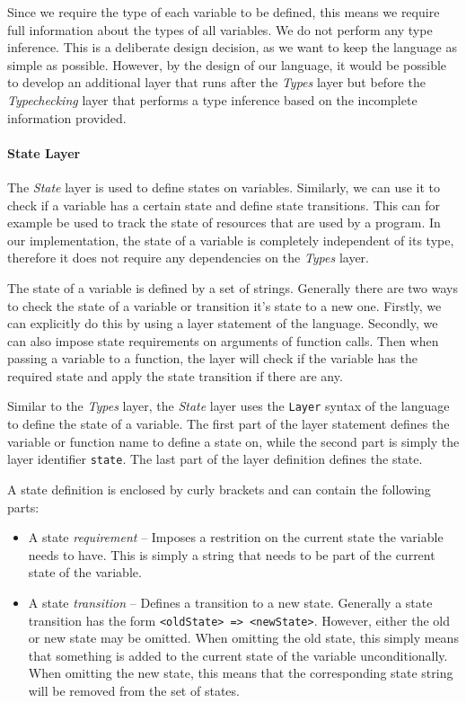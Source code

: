 \documentclass[acmsmall, review, screen]{acmart}
\begin{document}
Since we require the type of each variable to be defined, this means we require full information about the types of all variables. We do not perform any type inference. This is a deliberate design decision, as we want to keep the language as simple as possible. However, by the design of our language, it would be possible to develop an additional layer that runs after the \textit{Types} layer but before the \textit{Typechecking} layer that performs a type inference based on the incomplete information provided.

\paragraph{State Layer}

The \textit{State} layer is used to define states on variables. Similarly, we can use it to check if a variable has a certain state and define state transitions. This can for example be used to track the state of resources that are used by a program. In our implementation, the state of a variable is completely independent of its type, therefore it does not require any dependencies on the \textit{Types} layer.

The state of a variable is defined by a set of strings. Generally there are two ways to check the state of a variable or transition it's state to a new one. Firstly, we can explicitly do this by using a layer statement of the language. Secondly, we can also impose state requirements on arguments of function calls. Then when passing a variable to a function, the layer will check if the variable has the required state and apply the state transition if there are any.

Similar to the \textit{Types} layer, the \textit{State} layer uses the \texttt{Layer} syntax of the language to define the state of a variable. The first part of the layer statement defines the variable or function name to define a state on, while the second part is simply the layer identifier \texttt{state}. The last part of the layer definition defines the state.

A state definition is enclosed by curly brackets and can contain the following parts:

\begin{itemize}
	\item A state \textit{requirement} -- Imposes a restrition on the current state the variable needs to have. This is simply a string that needs to be part of the current state of the variable.
	\item A state \textit{transition} -- Defines a transition to a new state. Generally a state transition has the form \texttt{<oldState> => <newState>}. However, either the old or new state may be omitted. When omitting the old state, this simply means that something is added to the current state of the variable unconditionally. When omitting the new state, this means that the corresponding state string will be removed from the set of states.
\end{itemize}
\end{document}
